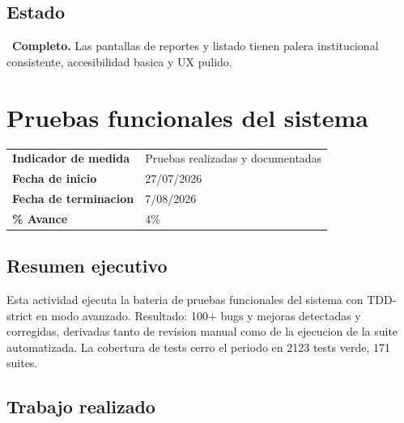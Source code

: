 \documentclass[11pt,a4paper,oneside]{report}
\begin{document}
\section{Estado}

\checkmark\ \textbf{Completo.} Las pantallas de reportes y listado tienen palera institucional consistente, accesibilidad basica y UX pulido.


\chapter{Pruebas funcionales del sistema}

\begin{tabularx}{\textwidth}{L{4cm} X}
\toprule
\textbf{Indicador de medida} & Pruebas realizadas y documentadas \\
\textbf{Fecha de inicio} & 27/07/2026 \\
\textbf{Fecha de terminacion} & 7/08/2026 \\
\textbf{\% Avance} & 4\% \\
\bottomrule
\end{tabularx}

\section{Resumen ejecutivo}

Esta actividad ejecuta la bateria de pruebas funcionales del sistema con TDD-strict en modo avanzado. Resultado: 100+ bugs y mejoras detectadas y corregidas, derivadas tanto de revision manual como de la ejecucion de la suite automatizada. La cobertura de tests cerro el periodo en 2123 tests verde, 171 suites.

\section{Trabajo realizado}
\end{document}
